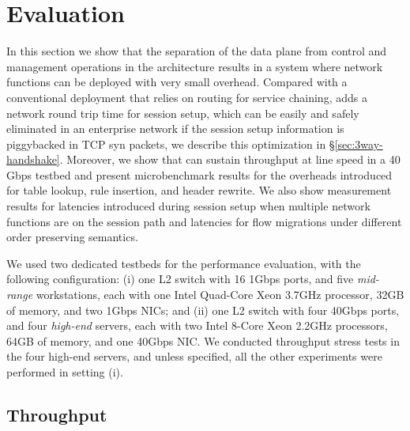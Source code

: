 
\section {Evaluation}

In this section we  show that  the  separation of the data  plane from
control and management operations in  the \system architecture results
in a  system where network functions  can be deployed with  very small
overhead.   Compared with a    conventional deployment that  relies on
routing for  service chaining, \system adds a  network round trip time
for session setup, which  can be  easily  and safely eliminated  in an
enterprise network if the  session setup information is piggybacked in
TCP  syn    packets,      we  describe      this optimization       in
\S\ref{sec:3way-handshake}. Moreover, we show that \system can sustain
throughput  at line  speed    in a   40   Gbps testbed  and    present
microbenchmark results for  the overheads introduced for table lookup,
rule insertion, and header rewrite.   We also show measurement results
for latencies introduced during  session  setup when multiple  network
functions are on the  session path and  latencies for flow  migrations
under different order preserving semantics.



We used two  dedicated testbeds for  the performance  evaluation, with
the following configuration:  (i) one L2 switch  with 16  1Gbps ports,
and five  {\em mid-range} workstations,  each with one Intel Quad-Core
Xeon 3.7GHz processor,  32GB of memory, and two  1Gbps NICs; and  (ii)
one L2 switch with four 40Gbps ports, and four {\em high-end} servers,
each with two Intel 8-Core Xeon 2.2GHz processors, 64GB of memory, and
one  40Gbps NIC.   We  conducted throughput  stress tests in  the four
high-end servers, and unless specified, all the other experiments were
performed in setting (i).

\subsection{Throughput }

